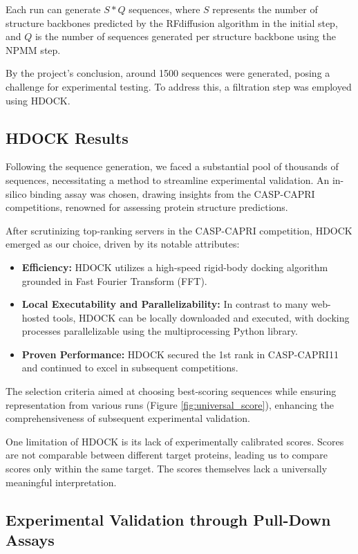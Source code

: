 \documentclass[11pt,a4paper]{article}
\begin{document}
Each run can generate $S*Q$ sequences, where $S$ represents the number of structure backbones predicted by the RFdiffusion algorithm in the initial step, and $Q$ is the number of sequences generated per structure backbone using the NPMM step.

By the project's conclusion, around 1500 sequences were generated, posing a challenge for experimental testing. To address this, a filtration step was employed using HDOCK.

\subsection{HDOCK Results}

Following the sequence generation, we faced a substantial pool of thousands of sequences, necessitating a method to streamline experimental validation. An in-silico binding assay was chosen, drawing insights from the CASP-CAPRI competitions, renowned for assessing protein structure predictions.

After scrutinizing top-ranking servers in the CASP-CAPRI competition, HDOCK emerged as our choice, driven by its notable attributes:

\begin{itemize}
    \item \textbf{Efficiency:} HDOCK utilizes a high-speed rigid-body docking algorithm grounded in Fast Fourier Transform (FFT).
    \item \textbf{Local Executability and Parallelizability:} In contrast to many web-hosted tools, HDOCK can be locally downloaded and executed, with docking processes parallelizable using the multiprocessing Python library.
    \item \textbf{Proven Performance:} HDOCK secured the 1st rank in CASP-CAPRI11 and continued to excel in subsequent competitions.
\end{itemize}

The selection criteria aimed at choosing best-scoring sequences while ensuring representation from various runs (Figure \ref{fig:universal_score}), enhancing the comprehensiveness of subsequent experimental validation.

One limitation of HDOCK is its lack of experimentally calibrated scores. Scores are not comparable between different target proteins, leading us to compare scores only within the same target. The scores themselves lack a universally meaningful interpretation.


\subsection{Experimental Validation through Pull-Down Assays}
\end{document}
